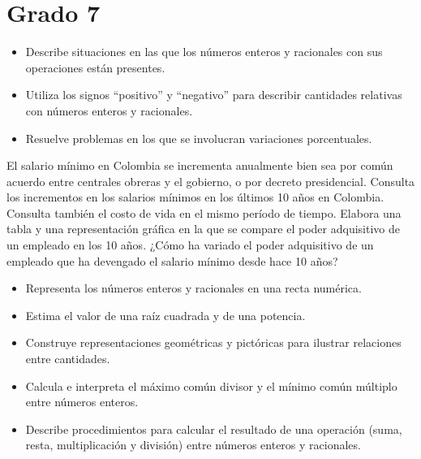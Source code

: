 \section{Grado 7}\label{grado:7}


\evidencias

\begin{itemize}
  \item Describe situaciones en las que los números enteros y racionales con sus operaciones están presentes.
  \item Utiliza los signos “positivo” y “negativo” para describir cantidades relativas con números enteros y racionales.
  \item Resuelve problemas en los que se involucran variaciones porcentuales.
\end{itemize}

\ejemplo

El salario mínimo en Colombia se incrementa anualmente bien sea por común acuerdo entre centrales obreras y el gobierno, o por decreto presidencial. Consulta los incrementos en los salarios mínimos en los últimos 10 años en Colombia. Consulta también el costo de vida en el mismo período de tiempo. Elabora una tabla y una representación gráfica en la que se compare el poder adquisitivo de un empleado en los 10 años. ¿Cómo ha variado el poder adquisitivo de un empleado que ha devengado el salario mínimo desde hace 10 años?



\evidencias

\begin{itemize}
  \item Representa los números enteros y racionales en una recta numérica.
  \item Estima el valor de una raíz cuadrada y de una potencia.
  \item Construye representaciones geométricas y pictóricas para ilustrar relaciones entre cantidades.
  \item Calcula e interpreta el máximo común divisor y el mínimo común múltiplo entre números enteros.
  \item Describe procedimientos para calcular el resultado de una operación (suma, resta, multiplicación y división) entre números enteros y racionales.
\end{itemize}

